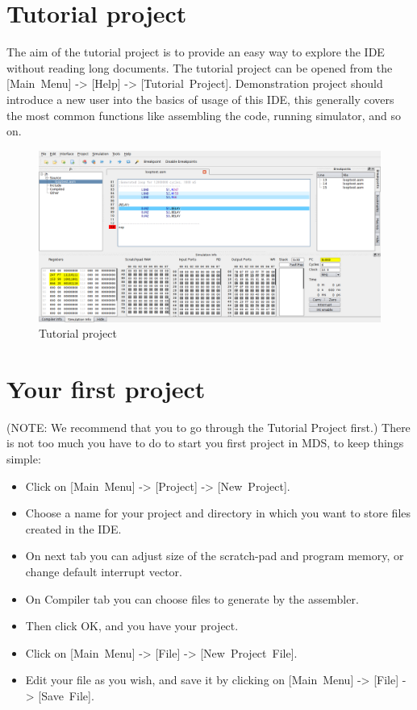\section{Tutorial project}
    The aim of the tutorial project is to provide an easy way to explore the IDE without reading long documents.
    The tutorial project can be opened from the [Main~Menu] -> [Help] -> [Tutorial~Project]. Demonstration project
    should introduce a new user into the basics of usage of this IDE, this generally covers the most common functions
    like assembling the code, running simulator, and so on.
    \begin{figure}[h]
        \centering{}
        \includegraphics[width=\textwidth]{img/demonstration_1.png}
        \caption{Tutorial project}
    \end{figure}

\section{Your first project}
    (NOTE: We recommend that you to go through the Tutorial Project first.) There is not too much you have to do to start you first project in MDS, to keep things simple:
    \begin{itemize}
        \item Click on [Main~Menu] -> [Project] -> [New~Project].
        \item Choose a name for your project and directory in which you want to store files created in the IDE.
        \item On next tab you can adjust size of the scratch-pad and program memory, or change default interrupt vector.
        \item On Compiler tab you can choose files to generate by the assembler.
        \item Then click OK, and you have your project.
        \item Click on [Main~Menu] -> [File] -> [New~Project~File].
        \item Edit your file as you wish, and save it by clicking on [Main~Menu] -> [File] -> [Save~File].
    \end{itemize}


